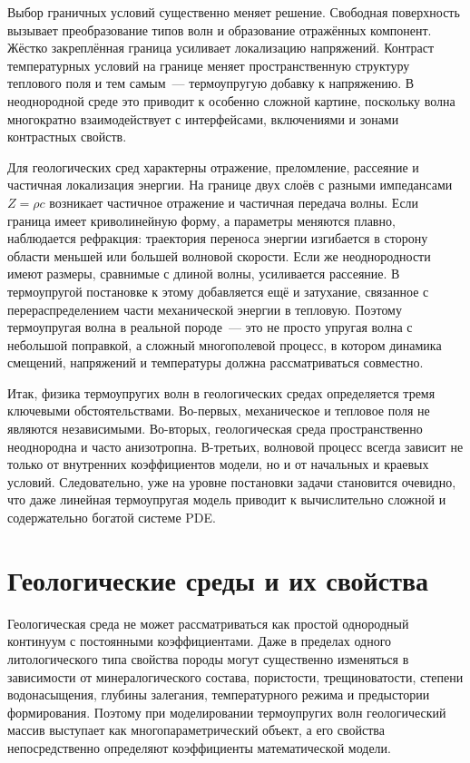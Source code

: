 Выбор граничных условий существенно меняет решение. Свободная поверхность вызывает преобразование типов волн и образование отражённых компонент. Жёстко закреплённая граница усиливает локализацию напряжений. Контраст температурных условий на границе меняет пространственную структуру теплового поля и тем самым~--- термоупругую добавку к напряжению. В неоднородной среде это приводит к особенно сложной картине, поскольку волна многократно взаимодействует с интерфейсами, включениями и зонами контрастных свойств.

Для геологических сред характерны отражение, преломление, рассеяние и частичная локализация энергии. На границе двух слоёв с разными импедансами $Z=\rho c$ возникает частичное отражение и частичная передача волны. Если граница имеет криволинейную форму, а параметры меняются плавно, наблюдается рефракция: траектория переноса энергии изгибается в сторону области меньшей или большей волновой скорости. Если же неоднородности имеют размеры, сравнимые с длиной волны, усиливается рассеяние. В термоупругой постановке к этому добавляется ещё и затухание, связанное с перераспределением части механической энергии в тепловую. Поэтому термоупругая волна в реальной породе~--- это не просто упругая волна с небольшой поправкой, а сложный многополевой процесс, в котором динамика смещений, напряжений и температуры должна рассматриваться совместно.

Итак, физика термоупругих волн в геологических средах определяется тремя ключевыми обстоятельствами. Во-первых, механическое и тепловое поля не являются независимыми. Во-вторых, геологическая среда пространственно неоднородна и часто анизотропна. В-третьих, волновой процесс всегда зависит не только от внутренних коэффициентов модели, но и от начальных и краевых условий. Следовательно, уже на уровне постановки задачи становится очевидно, что даже линейная термоупругая модель приводит к вычислительно сложной и содержательно богатой системе PDE.

\section{Геологические среды и их свойства}

Геологическая среда не может рассматриваться как простой однородный континуум с постоянными коэффициентами. Даже в пределах одного литологического типа свойства породы могут существенно изменяться в зависимости от минералогического состава, пористости, трещиноватости, степени водонасыщения, глубины залегания, температурного режима и предыстории формирования. Поэтому при моделировании термоупругих волн геологический массив выступает как многопараметрический объект, а его свойства непосредственно определяют коэффициенты математической модели.

